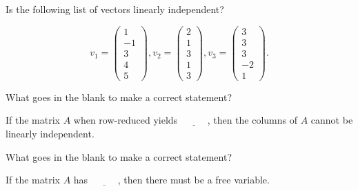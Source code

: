\endedxproblem


\endedxvertical









Is the following list of vectors linearly independent?

\[v_1 = \left(\begin{array}{c} 1 \\ -1  \\ 3 \\ 4 \\5 \end{array} \right), 
v_2 = \left(\begin{array}{c} 2 \\ 1  \\ 3 \\ 1 \\ 3 \end{array} \right),  
v_3 = \left(\begin{array}{c} 3 \\ 3  \\ 3 \\ -2 \\ 1 \end{array} \right). \]



\endedxproblem



What goes in the blank to make a correct statement?

If the matrix $A$ when row-reduced yields $\underline{\;\;\;\;\;\;\;\;\;\;}$, then
the columns of $A$ cannot be linearly independent.  


\endedxproblem



What goes in the blank to make a correct statement?

If the matrix $A$ has $\underline{\;\;\;\;\;\;\;\;\;\;}$, then
there must be a free variable.  

